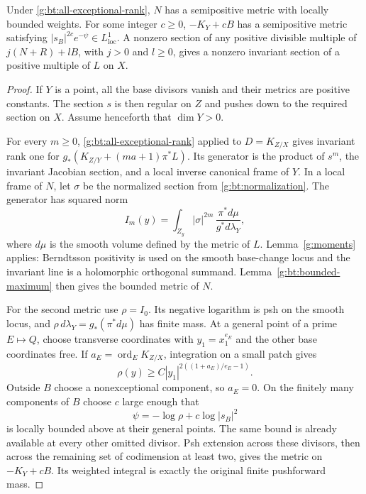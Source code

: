 \begin{proposition}
\label{g:bt:weighted-transfer}
Under \eqref{g:bt:all-exceptional-rank}, $N$ has a semipositive metric
with locally bounded weights.  For some integer $c\geq0$,
$-K_Y+cB$ has a semipositive metric satisfying
$|s_B|^{2c}e^{-\psi}\in L^1_{\mathrm{loc}}$.
A nonzero section of any positive divisible multiple of
$j(N+R)+lB$, with $j>0$ and $l\geq0$, gives a nonzero invariant section
of a positive multiple of $L$ on $X$.
\end{proposition}

\begin{proof}
If $Y$ is a point, all the base divisors vanish and their metrics are
positive constants. The section $s$ is then regular on $Z$ and pushes
down to the required section on $X$. Assume henceforth that $\dim Y>0$.

For every $m\geq0$, \eqref{g:bt:all-exceptional-rank} applied to
$D=K_{Z/X}$ gives invariant rank one for
$g_*(K_{Z/Y}+(ma+1)\pi^*L)$.  Its generator is the product of $s^m$,
the invariant Jacobian section, and a local inverse canonical frame of
$Y$.  In a local frame of $N$, let $\sigma$ be the normalized section
from \eqref{g:bt:normalization}.  The generator has squared norm
\[
 I_m(y)=\int_{Z_y}|\sigma|^{2m}\,
                         \frac{\pi^*d\mu}{g^*d\lambda_Y},
\]
where $d\mu$ is the smooth volume defined by the metric of $L$.
Lemma~\ref{g:moments} applies: Berndtsson positivity is used on the
smooth base-change locus and the invariant line is a holomorphic
orthogonal summand.  Lemma~\ref{g:bt:bounded-maximum} then gives the
bounded metric of $N$.

For the second metric use $\rho=I_0$.  Its negative logarithm is psh on
the smooth locus, and $\rho\,d\lambda_Y=g_*(\pi^*d\mu)$ has finite mass.
At a general point of a prime $E\mapsto Q$, choose transverse coordinates
with $y_1=x_1^{e_E}$ and the other base coordinates free.
If $a_E=\operatorname{ord}_E K_{Z/X}$, integration on a small patch gives
\[
                 \rho(y)\geq C|y_1|^{2((1+a_E)/e_E-1)}.
\]
Outside $B$ choose a nonexceptional component, so $a_E=0$.
On the finitely many components of $B$ choose $c$ large enough that
\[
                     \psi=-\log\rho+c\log|s_B|^2
\]
is locally bounded above at their general points.  The same bound is
already available at every other omitted divisor.  Psh extension across
these divisors, then across the remaining set of codimension at least
two, gives the metric on $-K_Y+cB$.  Its weighted integral is exactly
the original finite pushforward mass.


\end{proof}
